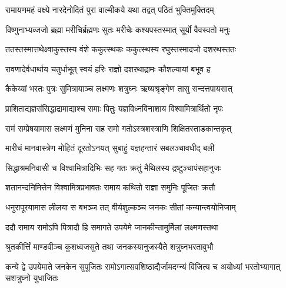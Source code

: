 

\storymeta


\twolineshloka
{रामायणमहं वक्ष्ये नारदेनोदितं पुरा}
{वाल्मीकये यथा तद्वत् पठितं भुक्तिमुक्तिदम्} %

\twolineshloka
{विष्णुनाभ्यव्जजो ब्रह्मा मरीचिर्ब्रह्मणः सुतः}
{मरीचेः कश्यपस्तस्मात् सूर्यो वैवस्वतो मनुः} %

\twolineshloka
{ततस्तस्मात्तथेक्ष्वाकुस्तस्य वंशे ककुत्स्थकः}
{ककुत्स्थस्य रघुस्तस्मादजो दशरथस्ततः} %

\twolineshloka
{रावणादेर्वधार्थाय चतुर्धाभूत् स्वयं हरिः}
{राज्ञो दशरथाद्रामः कौशल्यायां बभूव ह} %

\twolineshloka
{कैकेय्यां भरतः पुत्रः सुमित्रायाञ्च लक्ष्मणः}
{शत्रुघ्नः ऋष्यश्रृङ्गेण तासु सन्दत्तपायसात्} %

\twolineshloka
{प्राशिताद्यज्ञसंसिद्धाद्रामाद्याश्च समाः पितुः}
{यज्ञविध्नविनाशाय विश्वामित्रार्थितो नृपः} %

\twolineshloka
{रामं सम्प्रेषयामास लक्ष्मणं मुनिना सह}
{रामो गतोऽस्त्रशस्त्राणि शिक्षितस्ताडकान्तकृत्} %

\twolineshloka
{मारीचं मानवास्त्रेण मोहितं दूरतोऽनयत्}
{सुबाहुं यज्ञहन्तारं सबलञ्चावधीद् बली} %

\twolineshloka
{सिद्धाश्रमनिवासी च विश्वामित्रादिभिः सह}
{गतः क्रतुं मैथिलस्य द्रष्टुञ्चापंसहानुजः} %

\twolineshloka
{शतानन्दनिमित्तेन विश्वामित्रप्रभावतः}
{रामाय कथितो राज्ञा समुनिः पूजितः क्रतौ} %

\twolineshloka
{धनुरापूरयामास लीलया स बभञ्ज तत् }
{वीर्यशुल्कञ्च जनकः सीतां कन्यान्त्वयोनिजाम्} %

\twolineshloka
{ददौ रामाय रामोऽपि पित्रादौ हि समागते}
{उपयेमे जानकीन्तामुर्मिलां लक्ष्मणस्तथा} %

\twolineshloka
{श्रुतकीर्त्तिं माण्डवीञ्च कुशध्वजसुते तथा}
{जनकस्यानुजस्यैते शत्रुघ्नभरतावुभौ} %

\threelineshloka
{कन्ये द्वे उपयेमाते जनकेन सुपूजितः}
{रामोऽगात्सवशिष्ठाद्यैर्जामदग्न्यं विजित्य च}
{अयोध्यां भरतोभ्यागात् सशत्रुघ्नो युधाजितः} %

